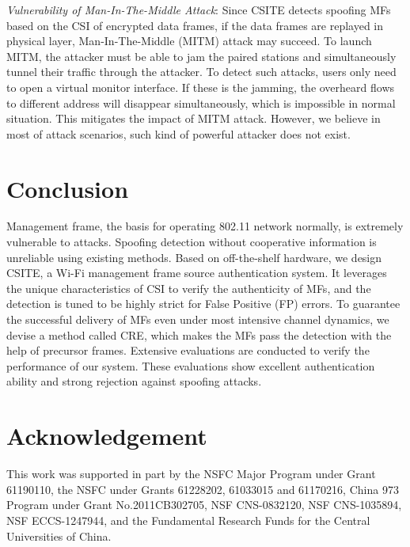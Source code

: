 \documentclass[conference]{IEEEtran}
\begin{document}
\textit{Vulnerability of Man-In-The-Middle Attack}:
Since CSITE detects spoofing MFs based on the CSI of encrypted data frames, if the data frames are replayed in physical layer, Man-In-The-Middle (MITM) attack may succeed. To launch MITM, the attacker must be able to jam the paired stations and simultaneously tunnel their traffic through the attacker. To detect such attacks, users only need to open a virtual monitor interface. If these is the jamming, the overheard flows to different address will disappear simultaneously, which is impossible in normal situation. This mitigates the impact of MITM attack. However, we believe in most of attack scenarios, such kind of powerful attacker does not exist.

\section{Conclusion}
\label{sec:conclusion}


Management frame, the basis for operating 802.11 network normally, is extremely vulnerable to attacks.
Spoofing detection without cooperative information is unreliable using existing methods. Based on off-the-shelf hardware, we design CSITE, a Wi-Fi management frame source authentication system.
It leverages the unique characteristics of CSI to verify the authenticity of MFs, and the detection is tuned to be highly strict for False Positive (FP) errors.
To guarantee the successful delivery of MFs even under most intensive channel dynamics, we devise a method called CRE, which makes the MFs pass the detection with the help of precursor frames.
Extensive evaluations are conducted to verify the performance of our system. These evaluations show excellent authentication ability and strong rejection against spoofing attacks.




\section*{Acknowledgement}
This work was supported in part by the NSFC Major Program under Grant 61190110, the NSFC under Grants 61228202, 61033015 and 61170216, China 973 Program under Grant No.2011CB302705, NSF CNS-0832120, NSF CNS-1035894, NSF ECCS-1247944, and the Fundamental Research Funds for the Central Universities of China.



\end{document}
